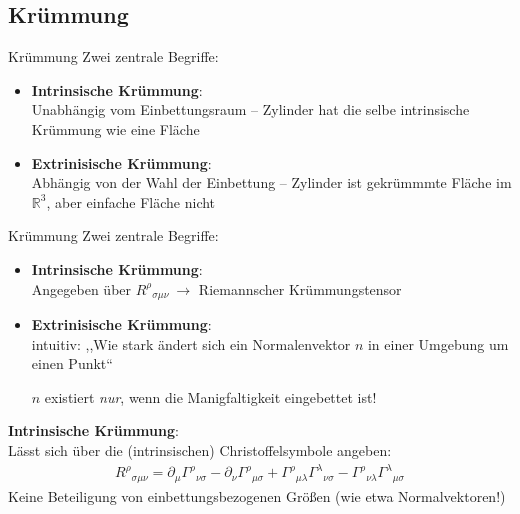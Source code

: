 \documentclass[mathserif]{beamer}
\theoremstyle{definition}
\begin{document}
\subsection{Krümmung}
	\begin{frame}{Krümmung}
		Zwei zentrale Begriffe:
		\begin{itemize}
			\item \textbf{Intrinsische Krümmung}:\\
				Unabhängig vom Einbettungsraum -- Zylinder hat die selbe intrinsische Krümmung wie eine Fläche
			\pause
			\item \textbf{Extrinisische Krümmung}:\\
				Abhängig von der Wahl der Einbettung -- Zylinder ist gekrümmmte Fläche im $\mathbb{R}^3$, aber einfache Fläche nicht
		\end{itemize}
	\end{frame}
	\begin{frame}{Krümmung}
		Zwei zentrale Begriffe:
		\begin{itemize}
			\item \textbf{Intrinsische Krümmung}:\\
				Angegeben über $R^\rho{}_{\sigma\mu\nu}\ \rightarrow$ Riemannscher Krümmungstensor
			\item \textbf{Extrinisische Krümmung}:\\
				intuitiv: ,,Wie stark ändert sich ein Normalenvektor $n$ in einer Umgebung um einen Punkt``
			\begin{center}
				$n$ existiert \textit{nur}, wenn die Manigfaltigkeit eingebettet ist!
			\end{center}
		\end{itemize}
	\end{frame}
	\begin{frame}
		\textbf{Intrinsische Krümmung}:\\
				Lässt sich über die (intrinsischen) Christoffelsymbole angeben:
				\begin{align}
					R^\rho{}_{\sigma\mu\nu} = \partial_\mu\Gamma^\rho{}_{\nu\sigma}
						- \partial_\nu\Gamma^\rho{}_{\mu\sigma}
						+ \Gamma^\rho{}_{\mu\lambda}\Gamma^\lambda{}_{\nu\sigma}
						- \Gamma^\rho{}_{\nu\lambda}\Gamma^\lambda{}_{\mu\sigma}
				\end{align}
				Keine Beteiligung von einbettungsbezogenen Größen (wie etwa Normalvektoren!)
	\end{frame}
\end{document}
